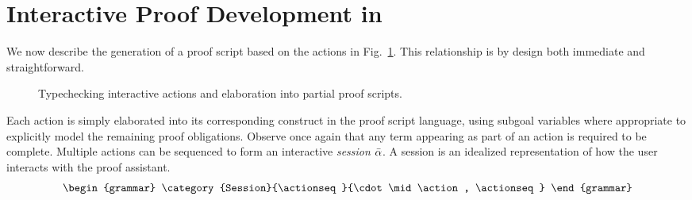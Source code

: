 \section{Interactive Proof Development in \Harpoon }
\label{sec:harpoon-actions}

We now describe the generation of a proof script based on the
actions in Fig.~\ref{fig:interactive}. This relationship is by
design both immediate and straightforward.

\begin{figure}[htb]
 

  \caption{%
    Typechecking interactive actions and elaboration into partial proof scripts.
  }
  \label{fig:interactive}
\end{figure}

Each action is simply elaborated into its corresponding construct in the proof
script language, using subgoal variables where appropriate to explicitly model
the remaining proof obligations. Observe once again that any \Beluga{} term
appearing as part of an action is required to be complete.
%
%
%
%
%
Multiple actions can be sequenced to form an interactive
\emph{session} $\bar{\alpha}$. A session is an idealized representation of how the
user interacts with the proof assistant.
%
\[
  \begin{grammar}
    \category{Session}{\actionseq}{\cdot \mid \action, \actionseq}
  \end{grammar}
\]
%

